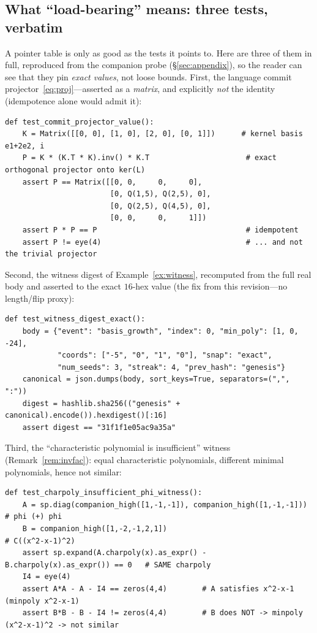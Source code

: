 \documentclass[11pt]{article}
\theoremstyle{plain}
\theoremstyle{definition}
\theoremstyle{remark}
\begin{document}
\subsection{What ``load-bearing'' means: three tests, verbatim}\label{subsec:demo}
A pointer table is only as good as the tests it points to. Here are three of them in full, reproduced from the
companion probe (\S\ref{sec:appendix}), so the reader can see that they pin \emph{exact values}, not loose
bounds. First, the language commit projector~\eqref{eq:proj}---asserted as a \emph{matrix}, and explicitly
\emph{not} the identity (idempotence alone would admit it):
\begin{lstlisting}
def test_commit_projector_value():
    K = Matrix([[0, 0], [1, 0], [2, 0], [0, 1]])      # kernel basis e1+2e2, i
    P = K * (K.T * K).inv() * K.T                      # exact orthogonal projector onto ker(L)
    assert P == Matrix([[0, 0,     0,     0],
                        [0, Q(1,5), Q(2,5), 0],
                        [0, Q(2,5), Q(4,5), 0],
                        [0, 0,     0,     1]])
    assert P * P == P                                  # idempotent
    assert P != eye(4)                                 # ... and not the trivial projector
\end{lstlisting}
Second, the witness digest of Example~\ref{ex:witness}, recomputed from the full real body and asserted to the
exact $16$-hex value (the fix from this revision---no length/flip proxy):
\begin{lstlisting}
def test_witness_digest_exact():
    body = {"event": "basis_growth", "index": 0, "min_poly": [1, 0, -24],
            "coords": ["-5", "0", "1", "0"], "snap": "exact",
            "num_seeds": 3, "streak": 4, "prev_hash": "genesis"}
    canonical = json.dumps(body, sort_keys=True, separators=(",", ":"))
    digest = hashlib.sha256(("genesis" + canonical).encode()).hexdigest()[:16]
    assert digest == "31f1f1e05ac9a35a"
\end{lstlisting}
Third, the ``characteristic polynomial is insufficient'' witness (Remark~\ref{rem:invfac}): equal
characteristic polynomials, different minimal polynomials, hence not similar:
\begin{lstlisting}
def test_charpoly_insufficient_phi_witness():
    A = sp.diag(companion_high([1,-1,-1]), companion_high([1,-1,-1]))   # phi (+) phi
    B = companion_high([1,-2,-1,2,1])                                   # C((x^2-x-1)^2)
    assert sp.expand(A.charpoly(x).as_expr() - B.charpoly(x).as_expr()) == 0   # SAME charpoly
    I4 = eye(4)
    assert A*A - A - I4 == zeros(4,4)        # A satisfies x^2-x-1  (minpoly x^2-x-1)
    assert B*B - B - I4 != zeros(4,4)        # B does NOT -> minpoly (x^2-x-1)^2 -> not similar
\end{lstlisting}
\end{document}
